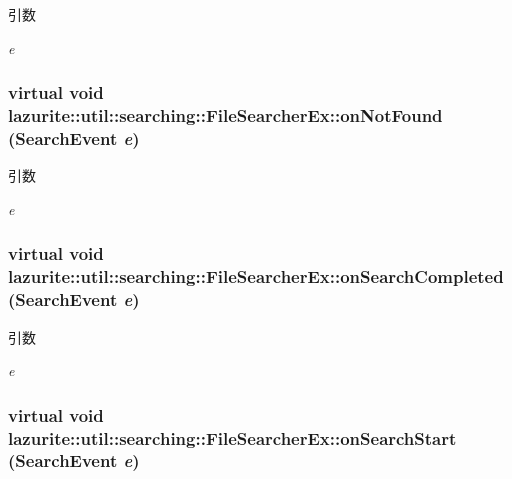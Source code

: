 \begin{DoxyParams}{引数}
\item[{\em e}]\end{DoxyParams}
\hypertarget{classlazurite_1_1util_1_1searching_1_1_file_searcher_ex_ad07092af0c702682e479c8894f00c0e3}{
\subsubsection[{onNotFound}]{\setlength{\rightskip}{0pt plus 5cm}virtual void lazurite::util::searching::FileSearcherEx::onNotFound ({\bf SearchEvent} {\em e})}}
\label{classlazurite_1_1util_1_1searching_1_1_file_searcher_ex_ad07092af0c702682e479c8894f00c0e3}

\begin{DoxyParams}{引数}
\item[{\em e}]\end{DoxyParams}
\hypertarget{classlazurite_1_1util_1_1searching_1_1_file_searcher_ex_a233744e0530f77a81f9bfed5e3b10b34}{
\subsubsection[{onSearchCompleted}]{\setlength{\rightskip}{0pt plus 5cm}virtual void lazurite::util::searching::FileSearcherEx::onSearchCompleted ({\bf SearchEvent} {\em e})}}
\label{classlazurite_1_1util_1_1searching_1_1_file_searcher_ex_a233744e0530f77a81f9bfed5e3b10b34}

\begin{DoxyParams}{引数}
\item[{\em e}]\end{DoxyParams}
\hypertarget{classlazurite_1_1util_1_1searching_1_1_file_searcher_ex_abb1155f911891e4d899be670f42cffd9}{
\subsubsection[{onSearchStart}]{\setlength{\rightskip}{0pt plus 5cm}virtual void lazurite::util::searching::FileSearcherEx::onSearchStart ({\bf SearchEvent} {\em e})}}
\label{classlazurite_1_1util_1_1searching_1_1_file_searcher_ex_abb1155f911891e4d899be670f42cffd9}


